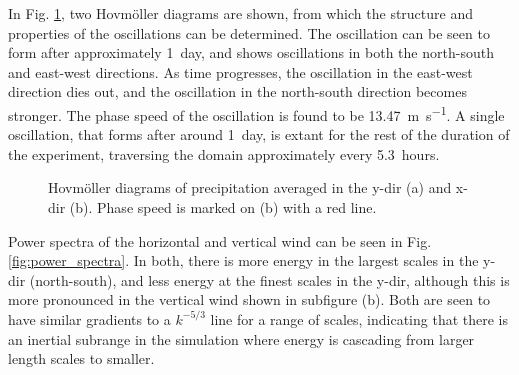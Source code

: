 \documentclass[11pt,a4paper]{article}
\begin{document}
In Fig. \ref{fig:hovmollers}, two Hovm{\"o}ller diagrams are shown, from which the structure and properties of the oscillations can be determined. The oscillation can be seen to form after approximately \SI{1}{day}, and shows oscillations in both the north-south and east-west directions. As time progresses, the oscillation in the east-west direction dies out, and the oscillation in the north-south direction becomes stronger. The phase speed of the oscillation is found to be \SI{13.47}{m.s^{-1}}. A single oscillation, that forms after around \SI{1}{day}, is extant for the rest of the duration of the experiment, traversing the domain approximately every \SI{5.3}{hours}.

\begin{figure}[hbt!]%
    \centering
    \qquad
    \caption{Hovm{\"o}ller diagrams of precipitation averaged in the y-dir (a) and x-dir (b). Phase speed is marked on (b) with a red line. }%
    \label{fig:hovmollers}%
\end{figure}

Power spectra of the horizontal and vertical wind can be seen in Fig. \ref{fig:power_spectra}. In both, there is more energy in the largest scales in the y-dir (north-south), and less energy at the finest scales in the y-dir, although this is more pronounced in the vertical wind shown in subfigure (b). Both are seen to have similar gradients to a $k^{-5/3}$ line for a range of scales, indicating that there is an inertial subrange in the simulation where energy is cascading from larger length scales to smaller.
\end{document}
